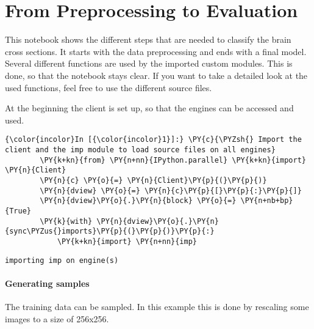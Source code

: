   \section{From Preprocessing to Evaluation}


    This notebook shows the different steps that are needed to classify the
brain cross sections. It starts with the data preprocessing and ends
with a final model. Several different functions are used by the imported
custom modules. This is done, so that the notebook stays clear. If you
want to take a detailed look at the used functions, feel free to use the
different source files.

At the beginning the client is set up, so that the engines can be
accessed and used.

    \begin{Verbatim}[commandchars=\\\{\}]
{\color{incolor}In [{\color{incolor}1}]:} \PY{c}{\PYZsh{} Import the client and the imp module to load source files on all engines}
        \PY{k+kn}{from} \PY{n+nn}{IPython.parallel} \PY{k+kn}{import} \PY{n}{Client}
        \PY{n}{c} \PY{o}{=} \PY{n}{Client}\PY{p}{(}\PY{p}{)}
        \PY{n}{dview} \PY{o}{=} \PY{n}{c}\PY{p}{[}\PY{p}{:}\PY{p}{]}
        \PY{n}{dview}\PY{o}{.}\PY{n}{block} \PY{o}{=} \PY{n+nb+bp}{True}
        \PY{k}{with} \PY{n}{dview}\PY{o}{.}\PY{n}{sync\PYZus{}imports}\PY{p}{(}\PY{p}{)}\PY{p}{:}
            \PY{k+kn}{import} \PY{n+nn}{imp}
\end{Verbatim}

    \begin{Verbatim}[commandchars=\\\{\}]
importing imp on engine(s)
    \end{Verbatim}


    \paragraph{Generating samples}


    The training data can be sampled. In this example this is done by
rescaling some images to a size of 256x256.

